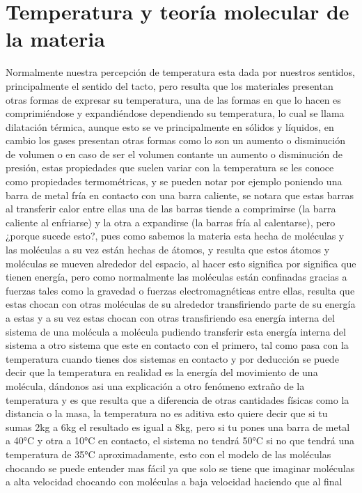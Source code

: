 \documentclass{article}
\begin{document}
\section*{Temperatura y teoría molecular de la materia}
Normalmente nuestra percepción de temperatura esta dada por nuestros sentidos, principalmente el sentido del tacto, pero resulta que los materiales
presentan otras formas de expresar su temperatura, una de las formas en que lo hacen es comprimiéndose y expandiéndose dependiendo su temperatura,
lo cual se llama dilatación térmica, aunque esto se ve principalmente en sólidos y líquidos, en cambio los gases presentan otras formas como lo son 
un aumento o disminución de volumen o en caso de ser el volumen contante un aumento o disminución de presión, estas propiedades que suelen variar con la 
temperatura se les conoce como propiedades termométricas, y se pueden notar por ejemplo poniendo una barra de metal fría en contacto con una barra caliente,
se notara que estas barras al transferir calor entre ellas una de las barras tiende a comprimirse (la barra caliente al enfriarse) y la otra a expandirse (la barras
fría al calentarse), pero ¿porque sucede esto?, pues como sabemos la materia esta hecha de moléculas y las moléculas a su vez están hechas de átomos,
y resulta que estos átomos y moléculas se mueven alrededor del espacio, al hacer esto significa por significa que tienen energía, pero como normalmente 
las moléculas están confinadas gracias a fuerzas tales como la gravedad o fuerzas electromagnéticas entre ellas, resulta que estas chocan con otras moléculas
de su alrededor transfiriendo parte de su energía a estas y a su vez estas chocan con otras transfiriendo esa energía interna del sistema de una molécula a 
molécula pudiendo transferir esta energía interna del sistema a otro sistema que este en contacto con el primero, tal como pasa con la temperatura cuando tienes
dos sistemas en contacto y por deducción se puede decir que la temperatura en realidad es la energía del movimiento de una molécula, dándonos asi una
explicación a otro fenómeno extraño de la temperatura y es que resulta que a diferencia de otras cantidades físicas como la distancia o la masa, la temperatura no es
aditiva esto quiere decir que si tu sumas 2kg a 6kg el resultado es igual a 8kg, pero si tu pones una barra de metal a 40°C y otra a 10°C en contacto,
el sistema no tendrá 50°C si no que tendrá una temperatura de 35°C aproximadamente, esto con el modelo de las moléculas chocando se puede
entender mas fácil ya que solo se tiene que imaginar moléculas a alta velocidad chocando con moléculas a baja velocidad haciendo que al final
\end{document}
